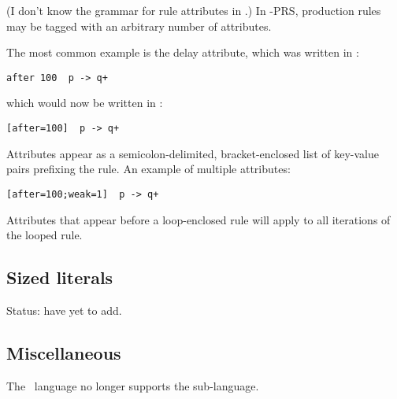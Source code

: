 (I don't know the grammar for rule attributes in \CAST.)
In \hac-PRS, production rules may be tagged with an
arbitrary number of attributes.  

The most common example is the  delay attribute, which
was written in \CAST:

\begin{verbatim}
after 100  p -> q+
\end{verbatim}

which would now be written in \hac:

\begin{verbatim}
[after=100]  p -> q+
\end{verbatim}

Attributes appear as a semicolon-delimited, bracket-enclosed list 
of key-value pairs prefixing the rule.  
An example of multiple attributes:

\begin{verbatim}
[after=100;weak=1]  p -> q+
\end{verbatim}

Attributes that appear before a loop-enclosed rule will apply to
all iterations of the looped rule.  

\subsection{Sized literals}
\label{sec:prs:size}

Status: have yet to add.  

\subsection{Miscellaneous}
\label{sec:prs:misc}

The \hac\ language no longer supports the  sub-language.  

